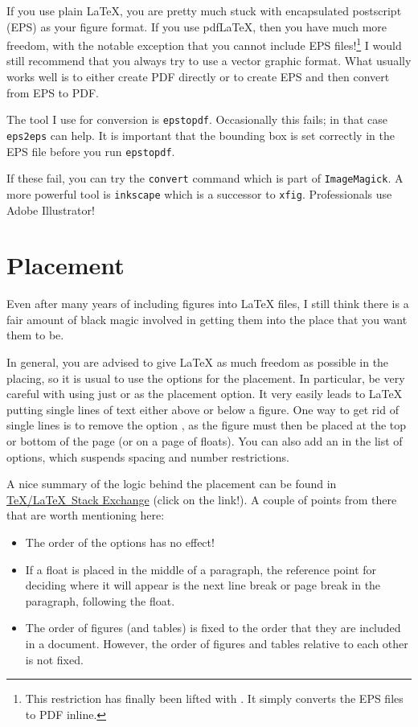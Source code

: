 If you use plain \LaTeX, you are pretty much stuck with encapsulated
postscript (EPS) as your figure format. If you use pdf\LaTeX, then you
have much more freedom, with the notable exception that you cannot
include EPS files!\footnote{%
This restriction has finally been lifted with . It
simply converts the EPS files to PDF inline.}
I would still recommend that you always try to use
a vector graphic format. What usually works well is to either create
PDF directly or to create EPS and then convert from EPS to PDF\@.

The tool I use for conversion is \texttt{epstopdf}. Occasionally this
fails; in that case \texttt{eps2eps} can help. It is important that
the bounding box is set correctly in the EPS file before you run
\texttt{epstopdf}.

If these fail, you can try the \texttt{convert} command which is part
of \texttt{ImageMagick}. A more powerful tool is \texttt{inkscape}
which is a successor to \texttt{xfig}. Professionals use Adobe Illustrator!


\section{Placement}%
\label{sec:fig:placement}

Even after many years of including figures into \LaTeX{} files, I
still think there is a fair amount of black magic involved in getting
them into the place that you want them to be.

In general, you are advised to give \LaTeX{} as much freedom as
possible in the placing, so it is usual to use the options
\Option{[htbp]} for the placement.
In particular, be very careful with
using just \Option{[h]} or \Option{[H]} as the placement option. It very
easily leads to \LaTeX{} putting single lines of text either above or
below a figure.
One way to get rid of single lines is to remove the option ,
as the figure must then be placed at the top or bottom of the page
(or on a page of floats).
You can also add an \Option{!} in the list
of options, which suspends spacing and number restrictions.

A nice summary of the logic behind the placement can be found in
\href{http://tex.stackexchange.com/questions/39017/how-to-influence-the-position-of-float-environments-like-figure-and-table-in-lat}{\TeX/\LaTeX\ Stack Exchange} (click on the link!).
A couple of points from there that are worth mentioning here:
\begin{itemize}
\item The order of the options  has no effect!
\item If a float is placed in the middle of a paragraph,
  the reference point for deciding where it will appear is the next line break or page break in the paragraph,
  following the float.
\item The order of figures (and tables) is fixed to the order that they are included in a document.
  However, the order of figures and tables relative to each other is not fixed.
\end{itemize}

